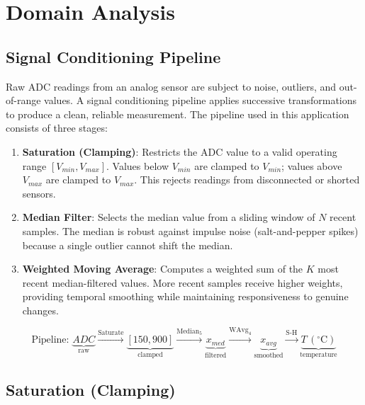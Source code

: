 \documentclass[12pt]{article}
\begin{document}
\section{Domain Analysis}

\subsection{Signal Conditioning Pipeline}

Raw ADC readings from an analog sensor are subject to noise, outliers, and out-of-range values. A signal conditioning pipeline applies successive transformations to produce a clean, reliable measurement. The pipeline used in this application consists of three stages:

\begin{enumerate}
  \item \textbf{Saturation (Clamping)}: Restricts the ADC value to a valid operating range $[V_{min}, V_{max}]$. Values below $V_{min}$ are clamped to $V_{min}$; values above $V_{max}$ are clamped to $V_{max}$. This rejects readings from disconnected or shorted sensors.
  \item \textbf{Median Filter}: Selects the median value from a sliding window of $N$ recent samples. The median is robust against impulse noise (salt-and-pepper spikes) because a single outlier cannot shift the median.
  \item \textbf{Weighted Moving Average}: Computes a weighted sum of the $K$ most recent median-filtered values. More recent samples receive higher weights, providing temporal smoothing while maintaining responsiveness to genuine changes.
\end{enumerate}

\begin{equation}
\text{Pipeline: } \underbrace{ADC}_{\text{raw}} \xrightarrow{\text{Saturate}} \underbrace{[150, 900]}_{\text{clamped}} \xrightarrow{\text{Median}_5} \underbrace{x_{med}}_{\text{filtered}} \xrightarrow{\text{WAvg}_{4}} \underbrace{x_{avg}}_{\text{smoothed}} \xrightarrow{\text{S-H}} \underbrace{T\,(^{\circ}\text{C})}_{\text{temperature}}
\label{eq:pipeline}
\end{equation}

\subsection{Saturation (Clamping)}
\end{document}
